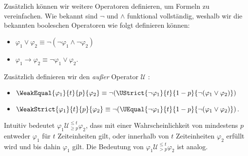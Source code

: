 Zusätzlich können wir weitere Operatoren definieren, um Formeln zu vereinfachen.
Wie bekannt sind $\neg$ und $\land$ funktional vollständig, weshalb wir die bekannten booleschen Operatoren wie folgt definieren können:
\begin{itemize}
	\item $\varphi_1 \lor \varphi_2 \equiv \neg(\neg\varphi_1 \land \neg\varphi_2)$
	\item $\varphi_1 \rightarrow \varphi_2 \equiv \neg\varphi_1 \lor \varphi_2$.
\end{itemize}
Zusätzlich definieren wir den \textit{außer} Operator $\mathcal{U}$ \cite{hansson1994logic}:
\begin{itemize}
	\item $ \WeakEqual{\varphi_1}{t}{p}{\varphi_2} \equiv \neg(\UStrict{\neg\varphi_1}{t}{1-p}{\neg(\varphi_1\lor\varphi_2)})$
	\item $ \WeakStrict{\varphi_1}{t}{p}{\varphi_2} \equiv \neg(\UEqual{\neg\varphi_1}{t}{1-p}{\neg(\varphi_1\lor\varphi_2)})$.
\end{itemize}
Intuitiv bedeutet $\varphi_1 \mathcal{U}^{\leq t}_{\geq p}\varphi_2$, dass mit einer Wahrscheinlichkeit von mindestens $p$ entweder $\varphi_1$ für $t$ Zeiteinheiten gilt, oder innerhalb von $t$ Zeiteinheiten $\varphi_2$ erfüllt wird und bis dahin $\varphi_1$ gilt. Die Bedeutung von $\varphi_1 \mathcal{U}^{\leq t}_{>p}\varphi_2$ ist analog. \cite{hansson1994logic}

